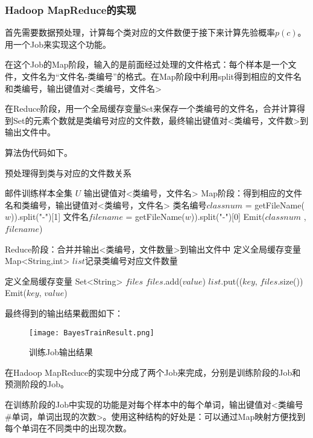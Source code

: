 \documentclass[lang=cn,11pt]{elegantpaper}
\begin{document}
\subsubsection{Hadoop MapReduce的实现}
首先需要数据预处理，计算每个类对应的文件数便于接下来计算先验概率$p(c)$。用一个Job来实现这个功能。

在这个Job的Map阶段，输入的是前面经过处理的文件格式：每个样本是一个文件，文件名为“文件名-类编号”的格式。在Map阶段中利用split得到相应的文件名和类编号，输出键值对<类编号，文件名>

在Reduce阶段，用一个全局缓存变量Set来保存一个类编号的文件名，合并计算得到Set的元素个数就是类编号对应的文件数，最终输出键值对<类编号，文件数>到输出文件中。

算法伪代码如下。
\begin{algorithm}[!htb]
  \caption{预处理得到类与对应的文件数关系}
  \label{alg:Framwork}
  \begin{algorithmic}[1]
    \Require
    邮件训练样本全集 $U$
    \Ensure
    输出键值对<类编号，文件名>
    \State Map阶段：得到相应的文件名和类编号，输出键值对<类编号，文件名>
        \State 类名编号$classnum$ = getFileName($w$)).split("-")[1]
		 \State 文件名$filename$ = getFileName($w$)).split("-")[0]
        \State Emit($classnum$ , $filename$)
      \EndFor
   \EndFunction

  \State Reduce阶段：合并并输出<类编号，文件数量>到输出文件中
  \State 定义全局缓存变量 Map<String,int> $list$记录类编号对应文件数量
  
    \State 定义全局缓存变量 Set<String> $files$
        \State $files$.add($value$)
    \EndFor
    \State $list$.put(($key$, $files$.size())
  \EndFunction
        \State Emit($key$, $value$)
    \EndFor
  \EndFunction
  \end{algorithmic}
\end{algorithm}

最终得到的输出结果截图如下：
\begin{figure}[htbp]
	\centering
	\texttt{[image: BayesTrainResult.png]}
	\caption{训练Job输出结果 \label{fig:BayesTrainResult}}
\end{figure}

在Hadoop MapReduce的实现中分成了两个Job来完成，分别是训练阶段的Job和预测阶段的Job。

在训练阶段的Job中实现的功能是对每个样本中的每个单词，输出键值对<类编号\#单词，单词出现的次数>。使用这种结构的好处是：可以通过Map映射方便找到每个单词在不同类中的出现次数。
\end{document}
